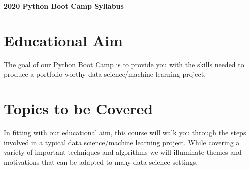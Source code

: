 \documentclass[12pt]{article}
\begin{document}
\begin{center}
\textbf{\Large{2020 Python Boot Camp Syllabus}}
\end{center}


\section*{Educational Aim}
The goal of our Python Boot Camp is to provide you with the skills needed to produce
a portfolio worthy data science/machine learning project.

\section{Topics to be Covered}
In fitting with our educational aim, this course will walk you through the steps
involved in a typical data science/machine learning project. While covering a variety
of important techniques and algorithms we will illuminate themes and motivations
that can be adapted to many data science settings.
\end{document}
